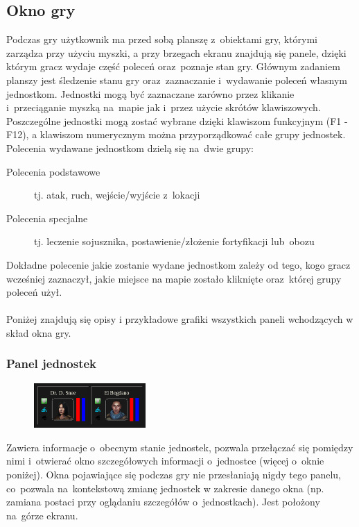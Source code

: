 \documentclass[licencjacka]{pracamgr}
\begin{document}
    \subsection{Okno gry}
      Podczas gry użytkownik ma przed sobą planszę z~obiektami gry, którymi zarządza przy użyciu myszki, a przy brzegach
      ekranu znajdują się panele, dzięki którym gracz wydaje część poleceń oraz~poznaje stan gry. Głównym zadaniem planszy
      jest śledzenie stanu gry oraz~zaznaczanie i~wydawanie poleceń własnym jednostkom. Jednostki mogą być zaznaczane
      zarówno przez klikanie i~przeciąganie myszką na~mapie jak i~przez użycie skrótów klawiszowych. Poszczególne 
      jednostki mogą zostać wybrane dzięki klawiszom funkcyjnym (F1 - F12), a klawiszom numerycznym można przyporządkować
      całe grupy jednostek.     Polecenia wydawane jednostkom dzielą się na~dwie grupy:
      \begin{description}
        \item[Polecenia podstawowe] tj. atak, ruch, wejście/wyjście z~lokacji
        \item[Polecenia specjalne] tj. leczenie sojusznika, postawienie/złożenie fortyfikacji lub~obozu
      \end{description}
      Dokładne polecenie jakie zostanie wydane jednostkom zależy od tego, kogo gracz wcześniej zaznaczył, jakie miejsce
      na mapie zostało kliknięte oraz~której grupy poleceń użył.
      \\\ \\ \noindent
      Poniżej znajdują się opisy i przykładowe grafiki wszystkich paneli wchodzących w skład okna gry.

      \subsubsection{Panel jednostek}
        \begin{figure}
          \vspace{-10pt}
          \includegraphics[width=0.38\textwidth]{PanelJednostek}
          \vspace{-10pt}
        \end{figure}
        Zawiera informacje o~obecnym stanie jednostek, pozwala przełączać się pomiędzy nimi i~otwierać okno szczegółowych
        informacji o~jednostce (więcej o~oknie poniżej). Okna pojawiające się podczas gry nie przesłaniają nigdy tego
        panelu, co~pozwala na~kontekstową zmianę jednostek w zakresie danego okna (np. zamiana postaci przy oglądaniu
        szczegółów o~jednostkach). Jest położony na~górze ekranu.
\end{document}

